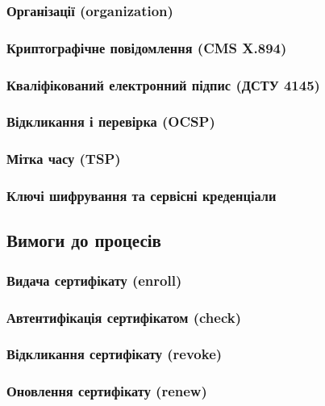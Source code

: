 \subsubsection{Організації (organization)}

\subsubsection{Криптографічне повідомлення (CMS X.894)}

\subsubsection{Кваліфікований електронний підпис (ДСТУ 4145)}

\subsubsection{Відкликання і перевірка (OCSP)}

\subsubsection{Мітка часу (TSP)}

\subsubsection{Ключі шифрування та сервісні креденціали}

\subsection{Вимоги до процесів}

\subsubsection{Видача сертифікату (enroll)}

\subsubsection{Автентифікація сертифікатом (check)}

\subsubsection{Відкликання сертифікату (revoke)}

\subsubsection{Оновлення сертифікату (renew)}

